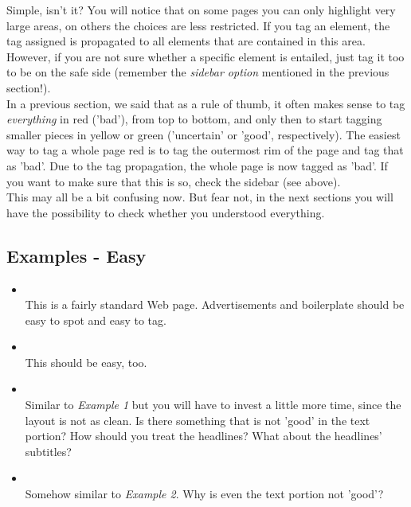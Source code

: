 \documentclass[12pt]{article}
\begin{document}
Simple, isn't it? You will notice that on some pages you can only highlight very large areas, on others the choices are less restricted. If you tag an element, the tag assigned is propagated to all elements that are contained in this area. However, if you are not sure whether a specific element is entailed, just tag it too to be on the safe side (remember the \emph{sidebar option} mentioned in the previous section!).\\

In a previous section, we said that as a rule of thumb, it often makes sense to tag \emph{everything} in red ('bad'), from top to bottom, and only then to start tagging smaller pieces in yellow or green ('uncertain' or 'good', respectively). The easiest way to tag a whole page red is to tag the outermost rim of the page and tag that as 'bad'. Due to the tag propagation, the whole page is now tagged as 'bad'. If you want to make sure that this is so, check the sidebar (see above).\\

This may all be a bit confusing now. But fear not, in the next sections you will have the possibility to check whether you understood everything. \\


\subsection{Examples - Easy}
\label{Examples}

\begin{itemize}
\item {} \\
This is a fairly standard Web page. Advertisements and boilerplate should be easy to spot and easy to tag.\\

\item {} \\
This should be easy, too.

\item {} \\
Similar to \emph{Example 1} but you will have to invest a little more time, since the layout is not as clean. Is there something that is not 'good' in the text portion? How should you treat the headlines? What about the headlines' subtitles? \\

\item {} \\
Somehow similar to \emph{Example 2}. Why is even the text portion not 'good'? \\

\end{itemize}
\end{document}

